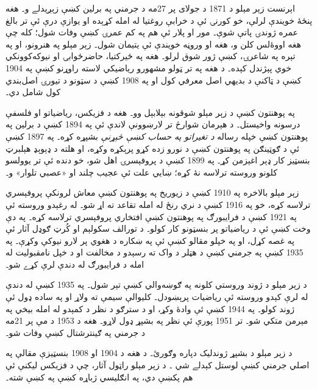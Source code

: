 \documentclass[../../../include/open-logic-section]{subfiles}
\begin{document}



اېرنست زېر مېلو د 1871 د جولای پر 27مه
د جرمني په برلين کښې زېږېدلے و۔
هغه پنځۀ خويندې لرلې، خو کورنۍ
ئې د خرابې روغتيا له امله کړېده
او يوازې درې ئې تر بالغ عمره
ژوندۍ پاتې شوې۔ مور او پلار ئې
هم په کم عمرۍ کښې وفات شول؛
کله چې هغه اووۀ‌لس کلن و، هغه
او وروڼه خويندې ئې يتيمان شول۔
زېر مېلو په هنرونو، او په تېره
په شاعرۍ، کښې ژور شوق لرلو۔
هغه په ځيرکتيا، حاضرځوابۍ او
نيوکه‌کوونکي خوي پېژندل کېده۔
د هغه په تر ټولو مشهورو رياضيکي
لاسته راوړنو کښې په 1904 کښې
د ټاکنې د بديهي اصل معرفي کول
او په 1908 کښې د سټونو د
تيورۍ اصل‌بندي کول شامل دي۔

په پوهنتون کښې د زېر مېلو شوقونه
بېلابېل وو۔ هغه د فزيکس،
رياضياتو او فلسفې درسونه واخيستل۔
د هېرمان شوارڅ تر لارښوونې لاندې
ئې په 1894 کښې د برلين په
پوهنتون کښې خپله رساله
\emph{د تغيراتو په حساب کښې
څېړنې} بشپړه کړه۔ په 1897
کښې ئې د ګوټينګن په پوهنتون
کښې د نورو زده کړو پرېکړه وکړه،
او هلته د ډېوېډ هېلبرټ بنسټيز
کار ډېر اغېزمن کړ۔ په 1899
کښې د پروفېسرۍ اهل شو، خو
دنده ئې تر يوولسو کلونو وروسته
ترلاسه نۀ کړه؛ ښايي علت ئې
عجيب چلند او «عصبي تلوار» و۔

زېر مېلو بالاخره په 1910 کښې د زيوريخ
په پوهنتون کښې معاش لرونکې
پروفېسري ترلاسه کړه، خو په
1916 کښې د نري رنځ له امله
تقاعد ته اړ شو۔ له رغېدو وروسته
ئې په 1921 کښې د فرايبورګ په
پوهنتون کښې افتخاري پروفېسري
ترلاسه کړه۔ په دې وخت کښې ئې
د رياضياتو پر بنسټونو کار کولو۔
د تورالف سکولېم او کُرټ ګوډل
آثار ئې په غصه کړل، او په خپلو
مقالو کښې ئې په ښکاره د هغوي
پر لارو نيوکې وکړې۔ په 1935
کښې په جرمني کښې د هټلر د
واک ته رسېدو د مخالفت او د
خپل نامقبوليت له امله د
فرايبورګ له دندې لرې کړے شو۔

د زېر مېلو د ژوند وروستي کلونه په
ګوښه‌والي کښې تېر شول۔ په 1935
کښې له دندې له لرې کېدو وروسته
ئې رياضيات پرېښودل۔ کليوالې
سيمې ته ولاړ او په ساده ډول
ئې ژوند کولو۔ په 1944 کښې ئې
وادۀ وکړ، او د سترګو د نظر د
کمېدو له امله بيخي په مېرمن
متکي شو۔ تر 1951 پورې ئې نظر
په بشپړ ډول لاړو۔ هغه د 1953
د مې پر 21مه د جرمني په
ګينترشتال کښې وفات شو۔

\begin{reading}
د زېر مېلو د بشپړ ژوندليک دپاره
\citet{Ebbinghaus2015} وګورئ۔ د
هغه د 1904 او 1908 بنسټيزې
مقالې په اصلي جرمني کښې لوستل
کېدلے شي
\citep{Zermelo1904,Zermelo1908}۔ د
زېر مېلو راټول آثار، چې د فزيکس
ليکنې ئې هم پکښې دي،
په انګليسي ژباړه کښې په
\citep{Ebbinghaus2010,Ebbinghaus2013}
کښې شته۔
\end{reading}
\end{document}
